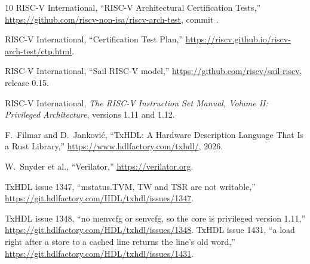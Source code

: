 \documentclass[journal,9pt]{IEEEtran}
\begin{document}
\begin{thebibliography}{10}
RISC-V International, ``RISC-V Architectural Certification Tests,''
\url{https://github.com/riscv-non-isa/riscv-arch-test}, commit
\code{\ActCommit}.

RISC-V International, ``Certification Test Plan,''
\url{https://riscv.github.io/riscv-arch-test/ctp.html}.

RISC-V International, ``Sail RISC-V model,''
\url{https://github.com/riscv/sail-riscv}, release 0.15.

RISC-V International, \emph{The RISC-V Instruction Set Manual, Volume
II: Privileged Architecture}, versions 1.11 and 1.12.

F.~Filmar and D.~Jankovi\'c, ``TxHDL: A Hardware Description Language
That Is a Rust Library,'' \url{https://www.hdlfactory.com/txhdl/},
2026.

W.~Snyder et al., ``Verilator,'' \url{https://verilator.org}.

TxHDL issue 1347, ``mstatus.TVM, TW and TSR are not writable,''
\url{https://git.hdlfactory.com/HDL/txhdl/issues/1347}.

TxHDL issue 1348, ``no menvcfg or senvcfg, so the core is privileged
version 1.11,''
\url{https://git.hdlfactory.com/HDL/txhdl/issues/1348}.
TxHDL issue 1431, ``a load right after a store to a cached line
returns the line's old word,''
\url{https://git.hdlfactory.com/HDL/txhdl/issues/1431}.
\end{thebibliography}
\end{document}
